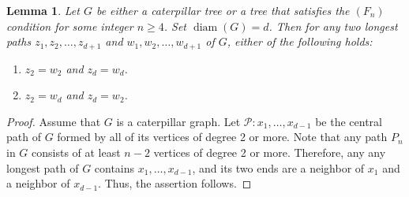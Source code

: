 \documentclass{amsart}
\newtheorem{lemma}[theorem]{Lemma}
\theoremstyle{remark}
\theoremstyle{definition}
\DeclareMathOperator{\diam}{diam}
\begin{document}
	
	\begin{lemma}\label{lem:2-longest-paths}
		Let $G$ be either a caterpillar tree or a tree that satisfies the $(F_n)$ condition for some integer $n\geq 4$. Set $\diam(G)=d$. Then for any two longest paths $z_1,z_2,\dots, z_{d+1}$ and  $w_1,w_2,\dots, w_{d+1}$ of $G$, either of the following holds:
		\begin{enumerate}
			\item $z_2=w_2$ and $z_{d}=w_{d}$.
			\item $z_2=w_{d}$ and $z_{d}=w_2$.
		\end{enumerate}
	\end{lemma}
	\begin{proof}
		Assume that $G$ is a caterpillar graph. Let $\mathcal{P}\colon x_1,\dots, x_{d-1}$ be the central path of $G$ formed by all of its vertices of degree 2 or more. Note that any path $P_n$ in $G$ consists of at least $n-2$ vertices of degree 2 or more. Therefore, any any longest path of $G$ contains $x_1,\dots, x_{d-1}$, and its two ends are a neighbor of $x_1$ and a neighbor of $x_{d-1}$. Thus, the assertion follows.
		
		
		
		
		

\end{proof}
\end{document}
